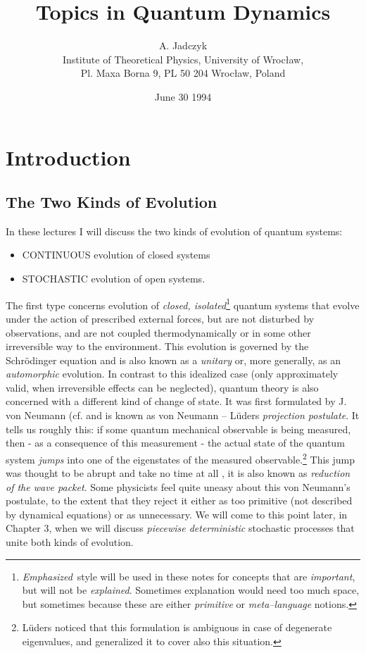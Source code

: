 \documentclass[12pt]{article}
\title{Topics in Quantum Dynamics}
\author{A.  Jadczyk \\
Institute of Theoretical Physics, 
 University of Wroc{\l }aw,  \\
Pl.  Maxa Borna 9,  PL 50 204 Wroc{\l }aw,  Poland} %
\date{June 30 1994}
\begin{document}
\newtheorem{theorem}{Theorem}
\maketitle
\section{Introduction}
\subsection{The Two Kinds of Evolution}
In these lectures I will discuss the two kinds of evolution of
quantum systems:  \begin{itemize}
\item CONTINUOUS evolution of closed systems
\item STOCHASTIC evolution of open systems.  
\end{itemize}
The first type
concerns evolution of {\sl closed, 
isolated}\footnote{
{\sl Emphasized}\,  style will be  used in these notes
for  concepts that are {\sl
important},  but will not be {\sl explained}.  Sometimes explanation
would need too much space,  but sometimes because these are either {\sl
primitive} or {\sl meta--language} notions. } quantum systems that evolve
under the action of prescribed external forces,  but are not disturbed by
observations,  and are not coupled thermodynamically or in some other
irreversible way to the environment.  This evolution is governed by the
Schr\"odinger equation and is also known as a {\sl unitary} or,  more
generally,  as an {\sl automorphic} evolution.  In contrast to this idealized
case  (only approximately valid, when irreversible effects can be neglected),
quantum theory is also concerned with a different kind of change of state. 
It was first formulated by J.  von Neumann  (cf.  \cite[Ch.  V. 1]{neu} and is
known as von Neumann -- L\"uders {\sl projection postulate}.  It tells us
roughly this:  if some quantum mechanical observable is being measured,
then - as
a consequence of this measurement - the actual state of the quantum system 
{\sl jumps} into one of the eigenstates of the measured
observable.\footnote{L\"uders
\cite{lud} noticed that this formulation is ambiguous in case of
degenerate eigenvalues,  and generalized it to cover also this
situation. } This jump was thought to be abrupt and take no time at all
,  it is also known as {\sl
reduction of the wave packet}.  Some physicists feel quite uneasy about this
von Neumann's postulate,  to the extent that they reject it either as too
primitive  (not described by dynamical equations) or as unnecessary.  We will
come to this point later,  in Chapter 3,  when we will discuss {\sl piecewise 
deterministic}
stochastic processes that unite both kinds of evolution. 
\end{document}
